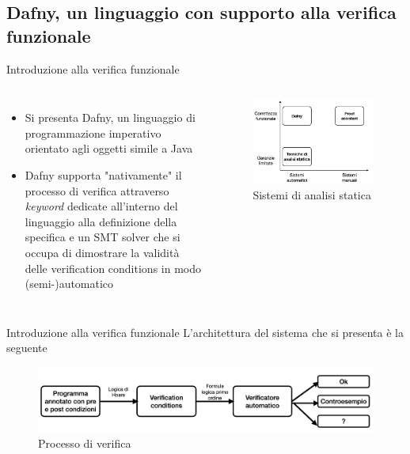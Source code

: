 \documentclass[]{beamer}
\begin{document}
\subsection{Dafny, un linguaggio con supporto alla verifica funzionale}
\begin{frame}{Introduzione alla verifica funzionale}
    \begin{columns}[onlytextwidth]
         \begin{itemize}
        \item Si presenta Dafny, un linguaggio di programmazione imperativo orientato agli oggetti simile a Java
        \item Dafny supporta "nativamente" il processo di verifica attraverso \textit{keyword} dedicate all'interno del linguaggio alla definizione della specifica e un SMT solver che si occupa di dimostrare la validità delle verification conditions in modo (semi-)automatico
    \end{itemize}
        \begin{figure}[h]
            \centering
            \includegraphics[scale=0.3]{assets/img/Levels_func_ver.png}
            \caption{Sistemi di analisi statica}
        \end{figure}
    \end{columns}
\end{frame}

\begin{frame}{Introduzione alla verifica funzionale}
L'architettura del sistema che si presenta è la seguente
\begin{figure}
    \centering
    \includegraphics[scale=0.4]{assets/img/Processo_verifica.png}
    \caption{Processo di verifica}
    \label{fig:verification_process}
\end{figure}
\end{frame}
\end{document}
